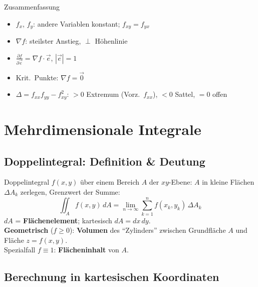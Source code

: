 \documentclass[a4paper, fontsize=7pt]{scrartcl}
\newcommand{\pdn}[2]{\frac{\partial #1}{\partial #2}}
\begin{document}
\begin{subbox}{Zusammenfassung}
\begin{itemize}
    \item $f_x$, $f_y$: andere Variablen konstant; $f_{xy} = f_{yx}$
    \item $\nabla f$: steilster Anstieg, $\perp$ Höhenlinie
    \item $\pdn{f}{\vec e} = \nabla f \cdot \vec e$, $|\vec e| = 1$
    \item Krit.\ Punkte: $\nabla f = \vec 0$
    \item $\Delta = f_{xx} f_{yy} - f_{xy}^2$: $> 0$ Extremum
          (Vorz.\ $f_{xx}$), $< 0$ Sattel, $= 0$ offen
\end{itemize}
\end{subbox}

\section{Mehrdimensionale Integrale}

\subsection{Doppelintegral: Definition \& Deutung}

\begin{mainbox}{Doppelintegral}
$f(x, y)$ über einem Bereich $A$ der $xy$-Ebene: $A$ in kleine Flächen
$\Delta A_k$ zerlegen, Grenzwert der Summe:
$$\iint_A f(x, y)\, dA = \lim_{n \to \infty} \sum_{k=1}^{n}
f(x_k, y_k)\, \Delta A_k$$
$dA$ = \textbf{Flächenelement}; kartesisch $dA = dx\, dy$.\\[2pt]
\textbf{Geometrisch} ($f \ge 0$): \textbf{Volumen} des ``Zylinders''
zwischen Grundfläche $A$ und Fläche $z = f(x, y)$.\\
Spezialfall $f \equiv 1$: \textbf{Flächeninhalt} von $A$.
\end{mainbox}

\subsection{Berechnung in kartesischen Koordinaten}
\end{document}
